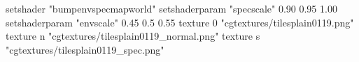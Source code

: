 setshader "bumpenvspecmapworld"
setshaderparam "specscale" 0.90 0.95 1.00
setshaderparam "envscale"  0.45 0.5 0.55
   texture 0 "cgtextures/tilesplain0119.png"
   texture n "cgtextures/tilesplain0119_normal.png"
   texture s "cgtextures/tilesplain0119_spec.png"